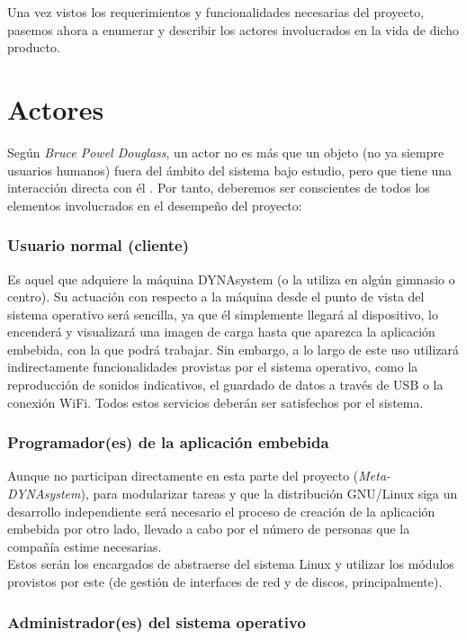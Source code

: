 Una vez vistos los requerimientos y funcionalidades necesarias del proyecto, pasemos ahora a enumerar y describir los actores involucrados en la vida de dicho producto.

\section{Actores}

Según \textit{Bruce Powel Douglass}, un actor no es más que un objeto (no ya siempre usuarios humanos) fuera del ámbito del sistema bajo estudio, pero que tiene una interacción directa con él \cite{real-time-uml-use-cases}. Por tanto, deberemos ser conscientes de todos los elementos involucrados en el desempeño del proyecto:

\subsubsection{Usuario normal (cliente)}

Es aquel que adquiere la máquina DYNAsystem (o la utiliza en algún gimnasio o centro). Su actuación con respecto a la máquina desde el punto de vista del sistema operativo será sencilla, ya que él simplemente llegará al dispositivo, lo encenderá y visualizará una imagen de carga hasta que aparezca la aplicación embebida, con la que podrá trabajar. Sin embargo, a lo largo de este uso utilizará indirectamente funcionalidades provistas por el sistema operativo, como la reproducción de sonidos indicativos, el guardado de datos a través de USB o la conexión WiFi. Todos estos servicios deberán ser satisfechos por el sistema.

\subsubsection{Programador(es) de la aplicación embebida}

Aunque no participan directamente en esta parte del proyecto (\textit{Meta-DYNAsystem}), para modularizar tareas y que la distribución GNU/Linux siga un desarrollo independiente será necesario el proceso de creación de la aplicación embebida por otro lado, llevado a cabo por el número de personas que la compañía estime necesarias.\\

Estos serán los encargados de abstraerse del sistema Linux y utilizar los módulos provistos por este (de gestión de interfaces de red y de discos, principalmente).

\subsubsection{Administrador(es) del sistema operativo}

